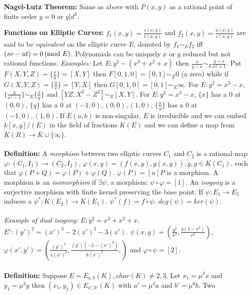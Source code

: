 \\
\\
{\bf Nagel-Lutz Theorem:} Same as above with $P(x,y)$ as a rational point of finite order
$y=0$ or $y|d^2$.
\begin{quote}
\end{quote}
{\bf Functions on Elliptic Curves:}
$f_1(x,y) = {\frac {s(x,y)} {t(x,y)}}$ and
$f_2(x,y) = {\frac {u(x,y)} {v(x,y)}}$ are said to be \emph{equivalent} on the
elliptic curve $E$, denoted by $f_1 \sim_E f_2$ iff $(sv-ut)= 0 \thinspace \textnormal{(mod } E \textnormal{)}$.
Polynomials can be uniquely $x$ or $y$ reduced but not rational functions.
\emph{Examples:}  Let $E: y^2-(x^3+x^2+x)$ then
$ {\frac {x}{y-x}} \sim_E {\frac {y+x}{x^2+1}}$.  
Put
$F(X,Y,Z)= \{ {\frac x y} \}= [X, Y]$ then $F[0,1,0] =[0,1] \sim_E 0$ (a zero) while
if $G(X,Y,Z)= \{ {\frac y x} \}= [Y, X]$ then $G[0,1,0] =[0,1] \sim_E \infty$.
For $E: y^2= x^3-x$, $\{ {\frac y {x^2-1}} \} \sim_E \{ {\frac x y} \}$ and
$[YZ, X^2-Z^2] \sim_E [X,Y]$.  
For $E: y^2= x^3-x$, 
$\{x \}$ has a $0$ at $(0,0)$,
$\{y \}$ has a $0$ at $(-1,0), (0,0), (1,0)$,
$\{ {\frac x y} \}$ has a $0$ at $(-1,0), (1,0)$.
If $E(a,b)$ is non-singular, $E$ is irreducible and
we can embed $k[x,y]/(E)$ in the field of fractions $K(E)$ 
and we can define a map from $K(R) \rightarrow
{\overline K} \cup \{\infty\}$.
\\
\\
{\bf Definition:}
A \emph{morphism} between two elliptic curves $C_1$ and $C_2$ is a rational map
$\varphi: (C_1, I_1) \rightarrow (C_2 , I_2)$, 
$\varphi(x,y)= (f(x,y), g(x,y)), g, g \in K(C_1 )$, such that
$\varphi(P+Q)= \varphi(P)+\varphi(Q)$.  $\varphi(P)= [n]P$ is a morphism.  A
morphism is an \emph{isomorphism} if $\exists \psi$, a morphism: $\psi \circ \varphi= [1]$.
An \emph{isogony} is a surjective morphism with finite kernel preserving the base point.
If $\psi: E_1 \rightarrow E_2$ induces a $\psi^*: K(E_2) \rightarrow K(E_1)$.
$\psi^*(f)= f \circ \psi$.  $deg(\psi)= ker(\psi)$.
\\
\\
\emph{Example of dual isogony:} 
$E: y^2= x^3 + x^2 +x$,
$E': (y')^2= (x')^3 -2 (x')^2 -3 (x')$.  
$\psi(x,y)=
( {\frac {y^2} {x^2}}, {\frac {y(1-x^2)} {x^2}})$,
$\varphi(x',y')= ( {\frac {(y')^2} {4(x')^2}}, {\frac {(y')(-3-(x')^2)} {8(x')^2}},)$ 
and $\varphi \circ \psi= [2]$.
\\
\\
{\bf Definition:}
Suppose $E= E_{a,b}(K), char(K) \ne 2,3$.  Let $x_1= \mu^2x$ and $y_1= \mu^3 y$ then
$(x_1 , y_1) \in E_{a', b'}(K)$ with $a'= \mu^4 a$ and $b'= \mu^6b$.  Two 
